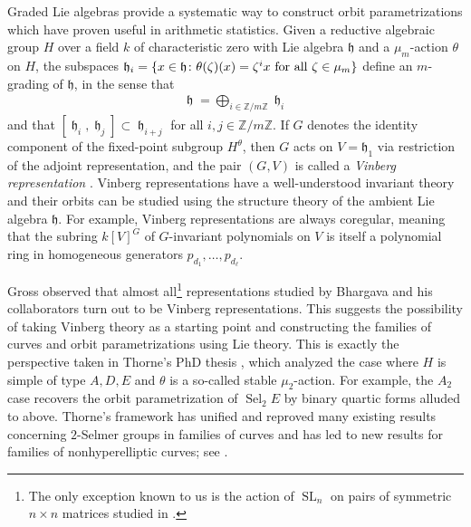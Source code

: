 \documentclass{article} %
\numberwithin{equation}{section}
\theoremstyle{definition}
\DeclareMathOperator{\SL}{SL}
\DeclareMathOperator{\lieh}{\mathfrak{h}}
\newcommand{\Z}{\mathbb{Z}}
\DeclareMathOperator{\Sel}{Sel}
\newcommand{\frakh}{\mathfrak h}
\begin{document}
Graded Lie algebras provide a systematic way to construct orbit parametrizations which have proven useful in arithmetic statistics.
Given a reductive algebraic group $H$ over a field $k$ of characteristic zero with Lie algebra $\frakh$ and a $\mu_m$-action $\theta$ on $H$, the subspaces $\frak{h}_i = \{x\in \frakh \colon \theta(\zeta)(x) = \zeta^i x\text{ for all }\zeta\in \mu_m\}$ define an $m$-grading of $\frakh$, in the sense that
\begin{align*}
    \lieh = \bigoplus_{i \in \Z/m\Z} \lieh_i
\end{align*}
and that $[\lieh_i,\lieh_j] \subset\lieh_{i+j}$ for all $i,j\in \Z/m\Z$.
If $G$ denotes the identity component of the fixed-point subgroup $H^{\theta}$, then $G$ acts on $V = \frakh_1$ via restriction of the adjoint representation, and the pair $(G,V)$ is called a \emph{Vinberg representation} \cite{Vinberg-theweylgroupofgraded}.
Vinberg representations have a well-understood invariant theory and their orbits can be studied using the structure theory of the ambient Lie algebra $\frakh$. 
For example, Vinberg representations are always coregular, meaning that the subring $k[V]^G$ of $G$-invariant polynomials on $V$ is itself a polynomial ring in homogeneous generators $p_{d_1}, \dots, p_{d_{\ell}}$.


Gross \cite{Gross-BhargavasrepresentationsandVinberg} observed that almost all\footnote{The only exception known to us is the action of $\SL_n$ on pairs of symmetric $n\times n$ matrices studied in \cite{BhargavaGrossWang-positiveproportionnopoints}.} representations studied by Bhargava and his collaborators turn out to be Vinberg representations.
This suggests the possibility of taking Vinberg theory as a starting point and constructing the families of curves and orbit parametrizations using Lie theory.
This is exactly the perspective taken in Thorne's PhD thesis \cite{Thorne-thesis}, which analyzed the case where $H$ is simple of type $A,D,E$ and $\theta$ is a so-called stable $\mu_2$-action. 
For example, the $A_2$ case recovers the orbit parametrization of $\Sel_2E$ by binary quartic forms alluded to above.
Thorne's framework has unified and reproved many existing results concerning $2$-Selmer groups in families of curves and has led to new results for families of nonhyperelliptic curves; see \cite{Thorne-E6paper, Romano-Thorne-ArithmeticofsingularitiestypeE, Laga-E6paper, Laga-ADEpaper}.
\end{document}
